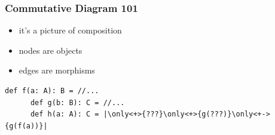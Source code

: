 \documentclass[include/preamble.tex]{subfiles}
\begin{document}
{

  \begin{frame}
    \frametitle{Commutative Diagram 101}
    \begin{itemize}
    \item it's a picture of composition
    \item nodes are objects
    \item edges are morphisms
    \end{itemize}
  \end{frame}

  
}

\begin{frame}[fragile]
  \begin{center}
    \pause
    \pause
    \newline
    \newline
    \begin{lstlisting}[style=scala, escapeinside=||]
      def f(a: A): B = //...
      def g(b: B): C = //...
      def h(a: A): C = |\only<+>{???}\only<+>{g(???)}\only<+->{g(f(a))}|
    \end{lstlisting}
  \end{center}
\end{frame}
\end{document}
